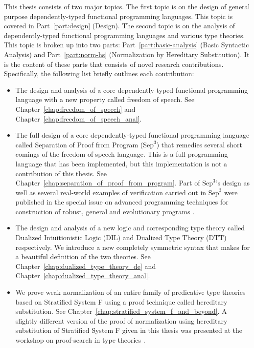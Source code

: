 \documentclass[phd,appendix,dedicationpage,ackpage,epigraphpage,figures]{uithesis}
\newcommand{\Sep}[0]{\text{Sep}^3}
\begin{document}
This thesis consists of two major topics.  The first topic is on the
design of general purpose dependently-typed functional programming
languages. This topic is covered in Part~\ref{part:design} (Design).
The second topic is on the analysis of dependently-typed functional
programming languages and various type theories.  This topic is broken
up into two parts: Part~\ref{part:basic-analysis} (Basic Syntactic
Analysis) and Part~\ref{part:norm-hs} (Normalization by Hereditary
Substitution).  It is the content of these parts that consists of
novel research contributions. Specifically, the following list briefly
outlines each contribution:
\begin{itemize}
\item The design and analysis of a core dependently-typed functional
  programming language with a new property called freedom of
  speech. See Chapter~\ref{chap:freedom_of_speech} and
  Chapter~\ref{chap:freedom_of_speech_anal}.

\item The full design of a core dependently-typed functional
  programming language called Separation of Proof from Program
  ($\Sep$) that remedies several short comings of the freedom of
  speech language.  This is a full programming language that has been
  implemented, but this implementation is not a contribution of this
  thesis.  See Chapter~\ref{chap:separation_of_proof_from_program}.
  Part of $\Sep$'s design as well as several real-world examples of
  verification carried out in $\Sep$ were published in the special
  issue on advanced programming techniques for construction of robust,
  general and evolutionary programs \cite{Kimmel:2012}.

\item The design and analysis of a new logic and corresponding type
  theory called Dualized Intuitionistic Logic (DIL) and Dualized Type
  Theory (DTT) respectively. We introduce a new completely symmetric
  syntax that makes for a beautiful definition of the two theories.
  See Chapter~\ref{chap:dualized_type_theory_de} and
  Chapter~\ref{chap:dualized_type_theory_anal}.

\item We prove weak normalization of an entire family of predicative
  type theories based on Stratified System F using a proof technique
  called hereditary substitution. See
  Chapter~\ref{chap:stratified_system_f_and_beyond}.  A slightly
  different version of the proof of normalization using hereditary
  substitution of Stratified System F given in this thesis was
  presented at the workshop on proof-search in type theories
  \cite{Eades:2010}.


\end{itemize}
\end{document}
